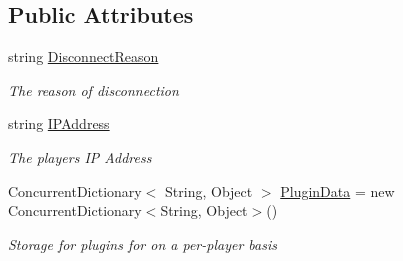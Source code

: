 \subsection*{Public Attributes}
\begin{DoxyCompactItemize}
\item 
string \hyperlink{classOTA_1_1BasePlayer_abe19975d0fc102a4dc9950045e2b6a1f}{Disconnect\+Reason}
\begin{DoxyCompactList}\small\item\em The reason of disconnection \end{DoxyCompactList}\item 
string \hyperlink{classOTA_1_1BasePlayer_a7d95a07d68f081c6363697469e1c117f}{I\+P\+Address}
\begin{DoxyCompactList}\small\item\em The players I\+P Address \end{DoxyCompactList}\item 
Concurrent\+Dictionary$<$ String, Object $>$ \hyperlink{classOTA_1_1BasePlayer_a9e32cc779b1659f2752ee5564650f5f1}{Plugin\+Data} = new Concurrent\+Dictionary$<$String, Object$>$()
\begin{DoxyCompactList}\small\item\em Storage for plugins for on a per-\/player basis \end{DoxyCompactList}\end{DoxyCompactItemize}
